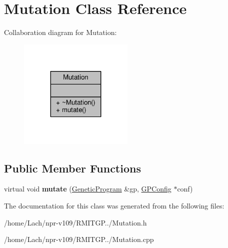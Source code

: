 \hypertarget{classMutation}{}\section{Mutation Class Reference}
\label{classMutation}


Collaboration diagram for Mutation\+:
\nopagebreak
\begin{figure}[H]
\begin{center}
\leavevmode
\includegraphics[width=155pt]{classMutation__coll__graph}
\end{center}
\end{figure}
\subsection*{Public Member Functions}
\begin{DoxyCompactItemize}
\item 
\hypertarget{classMutation_a49ce75b387f10483d51ef12af9525f1a}{}\label{classMutation_a49ce75b387f10483d51ef12af9525f1a} 
virtual void {\bfseries mutate} (\hyperlink{classGeneticProgram}{Genetic\+Program} \&gp, \hyperlink{classGPConfig}{G\+P\+Config} $\ast$conf)
\end{DoxyCompactItemize}


The documentation for this class was generated from the following files\+:\begin{DoxyCompactItemize}
\item 
/home/\+Lach/npr-\/v109/\+R\+M\+I\+T\+G\+P../Mutation.\+h\item 
/home/\+Lach/npr-\/v109/\+R\+M\+I\+T\+G\+P../Mutation.\+cpp\end{DoxyCompactItemize}
